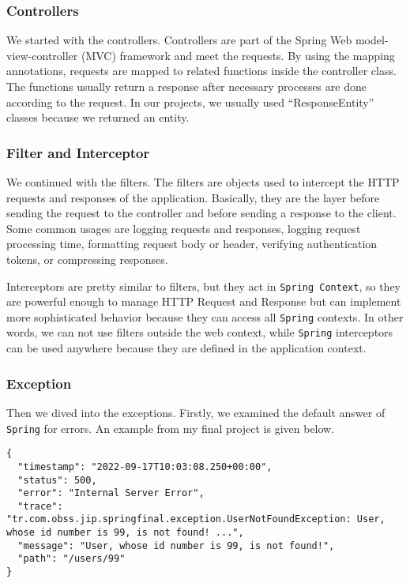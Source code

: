\subsubsection{Controllers}

We started with the controllers. Controllers are part of the Spring Web model-view-controller (MVC) framework and meet the requests. By using the mapping annotations, requests are mapped to related functions inside the controller class. The functions usually return a response after necessary processes are done according to the request. In our projects, we usually used ``ResponseEntity'' classes because we returned an entity.

\subsubsection{Filter and Interceptor}

We continued with the filters. The filters are objects used to intercept the HTTP requests and responses of the application. Basically, they are the layer before sending the request to the controller and before sending a response to the client. Some common usages are logging requests and responses, logging request processing time, formatting request body or header, verifying authentication tokens, or compressing responses.

Interceptors are pretty similar to filters, but they act in \texttt{Spring Context}, so they are powerful enough to manage HTTP Request and Response but can implement more sophisticated behavior because they can access all \texttt{Spring} contexts. In other words, we can not use filters outside the web context, while \texttt{Spring} interceptors can be used anywhere because they are defined in the application context.

\subsubsection{Exception}

Then we dived into the exceptions. Firstly, we examined the default answer of \texttt{Spring} for errors. An example from my final project is given below. 
\begin{verbatim}
{
  "timestamp": "2022-09-17T10:03:08.250+00:00",
  "status": 500,
  "error": "Internal Server Error",
  "trace": "tr.com.obss.jip.springfinal.exception.UserNotFoundException: User, whose id number is 99, is not found! ...",
  "message": "User, whose id number is 99, is not found!",
  "path": "/users/99"
}
\end{verbatim}

